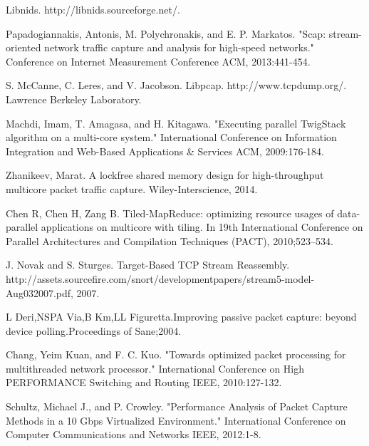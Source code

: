 \documentclass[conference]{IEEEtran}
\begin{document}
\begin{thebibliography}{1}
  Libnids. http://libnids.sourceforge.net/.
  
  Papadogiannakis, Antonis, M. Polychronakis, and E. P. Markatos. "Scap: stream-oriented network traffic capture and analysis for high-speed networks." Conference on Internet Measurement Conference ACM, 2013:441-454.
  
  S. McCanne, C. Leres, and V. Jacobson. Libpcap. http://www.tcpdump.org/. Lawrence Berkeley Laboratory.
  
  Machdi, Imam, T. Amagasa, and H. Kitagawa. "Executing parallel TwigStack algorithm on a multi-core system." International Conference on Information Integration and Web-Based Applications \& Services ACM, 2009:176-184.
  
  Zhanikeev, Marat. A lockfree shared memory design for high-throughput multicore packet traffic capture. Wiley-Interscience, 2014.
  
  Chen R, Chen H, Zang B. Tiled-MapReduce: optimizing resource usages of data-parallel applications on multicore with tiling. In 19th International Conference on Parallel Architectures and Compilation Techniques (PACT), 2010;523–534.
 
  
  J. Novak and S. Sturges. Target-Based TCP Stream Reassembly. http://assets.sourcefire.com/snort/developmentpapers/stream5-model-Aug032007.pdf, 2007.
  
  L Deri,NSPA Via,B Km,LL Figuretta.Improving passive packet capture: beyond device polling.Proceedings of Sane;2004.
  
  Chang, Yeim Kuan, and F. C. Kuo. "Towards optimized packet processing for multithreaded network processor." International Conference on High PERFORMANCE Switching and Routing IEEE, 2010:127-132.
  
  Schultz, Michael J., and P. Crowley. "Performance Analysis of Packet Capture Methods in a 10 Gbps Virtualized Environment." International Conference on Computer Communications and Networks IEEE, 2012:1-8.
  
  
\end{thebibliography}



\end{document}
